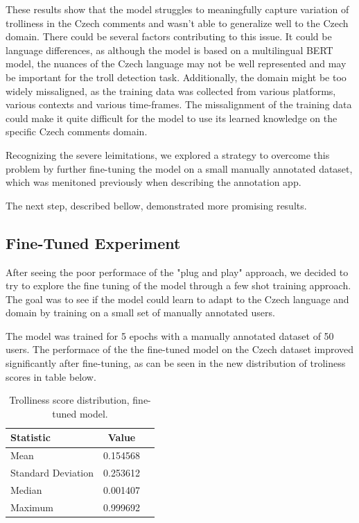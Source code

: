 \documentclass[twoside]{ctuthesis}
\theoremstyle{plain}
\theoremstyle{definition}
\theoremstyle{note}
\begin{document}
These results show that the model struggles to meaningfully capture variation of trolliness in the Czech comments and wasn't able to generalize well to the Czech domain. There could be several factors contributing to this issue. It could be language differences, as although the model is based on a multilingual BERT model, the nuances of the Czech language may not be well represented and may be important for the troll detection task. Additionally, the domain might be too widely missaligned, as the training data was collected from various platforms, various contexts and various time-frames. The missalignment of the training data could make it quite difficult for the model to use its learned knowledge on the specific Czech comments domain.\par 
Recognizing the severe leimitations, we explored a strategy to overcome this problem by further fine-tuning the model on a small manually annotated dataset, which was menitoned previously when describing the annotation app.\par
The next step, described bellow, demonstrated more promising results.\par

\subsection{Fine-Tuned Experiment}
After seeing the poor performace of the "plug and play" approach, we decided to try to explore the fine tuning of the model through a few shot training approach. The goal was to see if the model could learn to adapt to the Czech language and domain by training on a small set of manually annotated users.\par
The model was trained for 5 epochs with a manually annotated dataset of 50 users. The performace of the the fine-tuned model on the Czech dataset improved significantly after fine-tuning, as can be seen in the new distribution of troliness scores in table below.

\begin{table}[ht]
    \centering
    \caption{Trolliness score distribution, fine-tuned model.}
    \begin{tabular}{lcc}
        \toprule
        \textbf{Statistic} & \textbf{Value} \\
        \midrule
        Mean & 0.154568  \\
        Standard Deviation & 0.253612 \\
        Median     & 0.001407  \\
        Maximum & 0.999692  \\
        \bottomrule
    \end{tabular}
\end{table}
\end{document}
